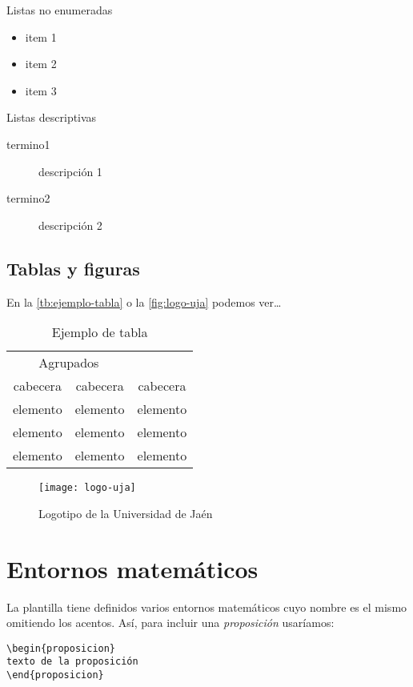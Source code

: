 Listas no enumeradas
\begin{itemize}
  \item item 1
  \item item 2
  \item item 3
  \end{itemize}

Listas descriptivas
\begin{description}
  \item[termino1] descripción 1
  \item[termino2] descripción 2
\end{description}
  
\subsection{Tablas y figuras}

En la \autoref{tb:ejemplo-tabla} o la \autoref{fig:logo-uja} podemos ver\ldots

\begin{table}[htpb]
  \centering
  \begin{tabular}{ccc} \toprule
    \multicolumn{2}{c}{Agrupados} \\ \cmidrule(r){1-2}
    cabecera & cabecera & cabecera          \\ \midrule
    elemento & elemento & elemento          \\ 
    elemento & elemento & elemento          \\ 
    elemento & elemento & elemento          \\ \bottomrule
  \end{tabular}
  \caption{Ejemplo de tabla}
  \label{tb:ejemplo-tabla}
\end{table}

\begin{figure}[htpb]
  \centering
  \texttt{[image: logo-uja]}
  \caption{Logotipo de la Universidad de Jaén}
  \label{fig:logo-uja}
\end{figure}

\section{Entornos matemáticos}\label{sec:entornos-matematicos}

La plantilla tiene definidos varios entornos matemáticos cuyo nombre es el mismo omitiendo los acentos. Así, para incluir una \emph{proposición} usaríamos:

\begin{verbatim}
\begin{proposicion}
texto de la proposición
\end{proposicion} 
\end{verbatim}

